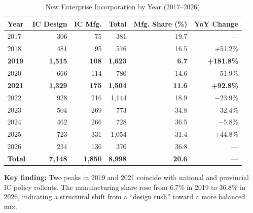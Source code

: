 \documentclass[12pt,a4paper]{article}
\newcommand{\tableHeaderRow}{\rowcolor{tealPrimary}\color{white}}
\newcommand{\tableOddRow}{\rowcolor{mintBG}}
\newcommand{\tableEvenRow}{\rowcolor{white}}
\begin{document}
\begin{table}[H]
\centering
\small
\caption{New Enterprise Incorporation by Year (2017--2026)}
\label{tab:established}
\begin{tabular}{lrrrrr}
\toprule
\tableHeaderRow
\textbf{Year} & \textbf{IC Design} & \textbf{IC Mfg.} & \textbf{Total} & \textbf{Mfg. Share (\%)} & \textbf{YoY Change} \\
\midrule
\tableOddRow  2017 & 306 & 75  & 381  & 19.7 & ---      \\
\tableEvenRow 2018 & 481 & 95  & 576  & 16.5 & +51.2\%  \\
\tableOddRow  \textbf{2019} & \textbf{1,515} & \textbf{108} & \textbf{1,623} & \textbf{6.7} & \textbf{+181.8\%} \\
\tableEvenRow 2020 & 666 & 114 & 780  & 14.6 & $-$51.9\% \\
\tableOddRow  \textbf{2021} & \textbf{1,329} & \textbf{175} & \textbf{1,504} & \textbf{11.6} & \textbf{+92.8\%} \\
\tableEvenRow 2022 & 928 & 216 & 1,144 & 18.9 & $-$23.9\% \\
\tableOddRow  2023 & 504 & 269 & 773  & 34.8 & $-$32.4\% \\
\tableEvenRow 2024 & 462 & 266 & 728  & 36.5 & $-$5.8\%  \\
\tableOddRow  2025 & 723 & 331 & 1,054 & 31.4 & +44.8\%  \\
\tableEvenRow 2026 & 234 & 136 & 370  & 36.8 & ---      \\
\midrule
\tableOddRow  \textbf{Total} & \textbf{7,148} & \textbf{1,850} & \textbf{8,998} & \textbf{20.6} & --- \\
\bottomrule
\end{tabular}
\end{table}

\textbf{Key finding:} Two peaks in 2019 and 2021 coincide with national and provincial
IC policy rollouts. The manufacturing share rose from 6.7\% in 2019 to 36.8\% in 2026,
indicating a structural shift from a ``design rush'' toward a more balanced mix.
\end{document}
